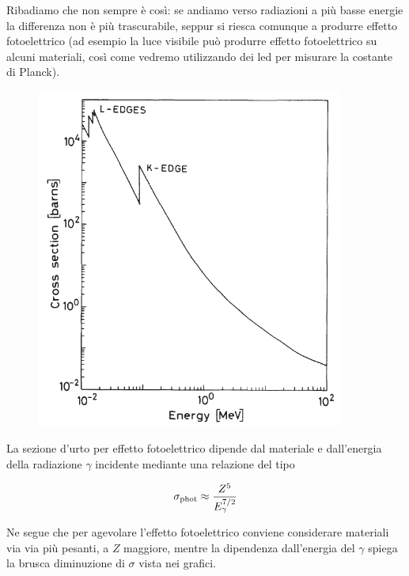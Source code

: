 Ribadiamo che non sempre è così: se andiamo verso radiazioni a più basse energie la differenza non è più trascurabile, seppur si riesca comunque a produrre effetto fotoelettrico (ad esempio la luce visibile può produrre effetto fotoelettrico su alcuni materiali, così come vedremo utilizzando dei led per misurare la costante di Planck).

\begin{minipage}{0.395\textwidth}
    \begin{figure}[H]
        \centering
        \includegraphics[width=0.9\textwidth]{immagini/sezione_durto_effetto_fotoelettrico.png}
    \end{figure}
\end{minipage}
\begin{minipage}{0.6\textwidth}
    La sezione d'urto per effetto fotoelettrico dipende dal materiale e dall'energia della radiazione $\gamma$ incidente mediante una relazione del tipo

    \begin{equation*}
        \sigma_{\rm phot} \approx \frac{Z^5}{E_{\gamma}^{7/2}}
    \end{equation*}

    Ne segue che per agevolare l'effetto fotoelettrico conviene considerare materiali via via più pesanti, a $Z$ maggiore, mentre la dipendenza dall'energia del $\gamma$ spiega la brusca diminuzione di $\sigma$ vista nei grafici.
\end{minipage}

